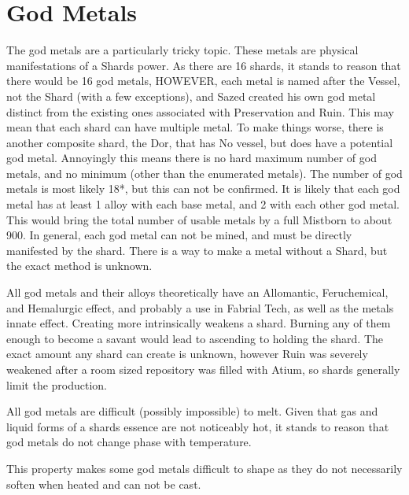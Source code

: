 \documentclass[conference]{IEEEtran}
\begin{document}
\section{\textbf{God Metals}}
The god metals are a particularly tricky topic.  These metals are physical manifestations of a Shards power.\cite{HoA-CH75}  As there are 16 shards, it stands to reason that there would be 16 god metals,\cite{SH-PT3-CH2} HOWEVER, each metal is named after the Vessel, not the Shard (with a few exceptions), and Sazed created his own god metal distinct from the existing ones associated with Preservation and Ruin.\cite{harmonium-existance}\cite{harm-split} This may mean that each shard can have multiple metal.  To make things worse, there is another composite shard,\cite{arcanum-sel} the Dor, that has No vessel,\cite{WoK-ep22} but does have a potential god metal.\cite{dorium}  Annoyingly this means there is no hard maximum number of god metals, and no minimum (other than the enumerated metals).  The number of god metals is most likely 18*, but this can not be confirmed.  It is likely that each god metal has at least 1 alloy with each base metal,\cite{shard-alloy} and 2 with each other god metal.\cite{leras-alloy}  This would bring the total number of usable metals by a full Mistborn to about 900.  In general, each god metal can not be mined,\cite{TFE-CH13} and must be directly manifested by the shard.\cite{RoW-CH84}  There is a way to make a metal without a Shard, but the exact method is unknown.\cite{godmaking}

All god metals and their alloys theoretically have an Allomantic, Feruchemical, and Hemalurgic effect,\cite{FEH+} and probably a use in Fabrial Tech,\cite{godrial} as well as the metals innate effect.\cite{FEH+}  Creating more intrinsically weakens a shard.\cite{HoA}\cite{WoF}  Burning any of them enough to become a savant would lead to ascending to holding the shard.\cite{godvant}
The exact amount any shard can create is unknown, however Ruin was severely weakened after a room sized repository was filled with Atium,\cite{HoA-CH81} so shards generally limit the production.

All god metals are difficult (possibly impossible) to melt.\cite{TLM-CH13}  Given that gas and liquid forms of a shards essence are not noticeably hot, it stands to reason that god metals do not change phase with temperature.  

This property makes some god metals difficult to shape as they do not necessarily soften when heated and can not be cast.\cite{TLM-CH19}
\end{document}
